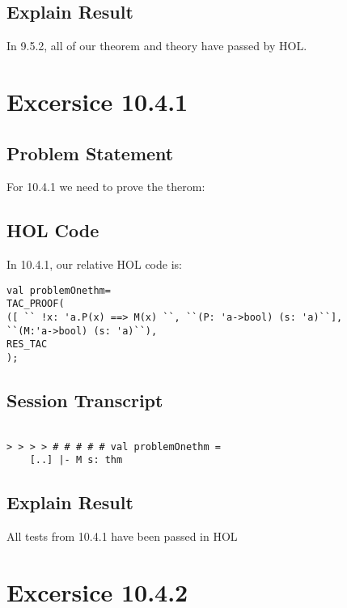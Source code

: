 \documentclass{report}
\begin{document}
\section{Explain Result}
\label{explain result 952}
In 9.5.2, all of our theorem and theory have passed by HOL.


\chapter{Excersice 10.4.1}
\label{Ex 1041}
\section{Problem Statement}
\label{Problem State 1041}
For 10.4.1 we need to prove the therom:



\section{HOL Code}
\label{HOl Code 1041}
In 10.4.1, our relative HOL code is:
\begin{lstlisting}[frame=trBL]
val problemOnethm=
TAC_PROOF(
([ `` !x: 'a.P(x) ==> M(x) ``, ``(P: 'a->bool) (s: 'a)``],
``(M:'a->bool) (s: 'a)``),
RES_TAC
);
\end{lstlisting}

\section{Session Transcript}
\label{Session Trans 1041}
\setcounter{sessioncount}{0}
\begin{session}
  \begin{scriptsize}
\begin{verbatim}

> > > > # # # # # val problemOnethm =
    [..] |- M s: thm
\end{verbatim}
  \end{scriptsize}
\end{session}
\section{Explain Result}
\label{explain result 1041}
All tests from 10.4.1 have been passed in HOL



\chapter{Excersice 10.4.2}
\label{Ex 1042}
\end{document}
